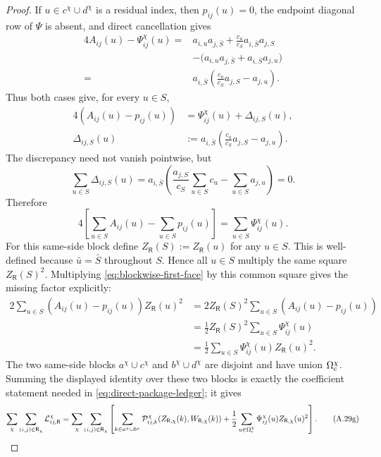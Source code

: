 \documentclass[11pt]{article}
\begin{document}
\begin{proof}
If $u\in c^\chi\cup d^\chi$ is a residual index, then
$p_{ij}(u)=0$, the endpoint diagonal row of $\Psi$ is absent, and direct
cancellation gives
\[
\begin{aligned}
4A_{ij}(u)-\Psi_{ij}^{\chi}(u)
={}&a_{i,u}a_{j,\bar S}
+\frac{c_u}{c_S}a_{i,\bar S}a_{j,S}\\
&-\bigl(a_{i,u}a_{j,\bar S}
       +a_{i,\bar S}a_{j,u}\bigr)\\
={}&a_{i,\bar S}\left(
\frac{c_u}{c_S}a_{j,S}-a_{j,u}\right).
\end{aligned}
\]
Thus both cases give, for every $u\in S$,
\[
\begin{aligned}
4(A_{ij}(u)-p_{ij}(u))
&=\Psi_{ij}^{\chi}(u)+\Delta_{ij,S}(u),\\
\Delta_{ij,S}(u)
&:=a_{i,\bar S}
 \left(\frac{c_u}{c_S}a_{j,S}-a_{j,u}\right).
\end{aligned}
\]
The discrepancy need not vanish pointwise, but
\[
 \sum_{u\in S}\Delta_{ij,S}(u)
 =a_{i,\bar S}\left(
 \frac{a_{j,S}}{c_S}\sum_{u\in S}c_u
 -\sum_{u\in S}a_{j,u}
 \right)=0.
\]
Therefore
\begin{equation}\label{eq:blockwise-first-face}
4\left[
 \sum_{u\in S}A_{ij}(u)-\sum_{u\in S}p_{ij}(u)
 \right]
=\sum_{u\in S}\Psi_{ij}^{\chi}(u).
\tag{A.30b}
\end{equation}
For this same-side block define $Z_{\mathsf R}(S):=Z_{\mathsf R}(u)$ for
any $u\in S$.  This is well-defined because $\bar u=\bar S$ throughout
$S$.  Hence all $u\in S$ multiply the same square
$Z_{\mathsf R}(S)^2$.  Multiplying \eqref{eq:blockwise-first-face} by this
common square gives the missing factor explicitly:
\[
\begin{aligned}
2\sum_{u\in S}(A_{ij}(u)-p_{ij}(u))Z_{\mathsf R}(u)^2
&=2Z_{\mathsf R}(S)^2
  \sum_{u\in S}(A_{ij}(u)-p_{ij}(u))\\
&=\frac12Z_{\mathsf R}(S)^2
  \sum_{u\in S}\Psi_{ij}^{\chi}(u)\\
&=\frac12\sum_{u\in S}
  \Psi_{ij}^{\chi}(u)Z_{\mathsf R}(u)^2.
\end{aligned}
\]
The two same-side blocks
$a^\chi\cup c^\chi$ and $b^\chi\cup d^\chi$ are disjoint and have union
$\Omega_{\rm c}^\chi$.  Summing the displayed identity over these two blocks
is exactly the coefficient statement needed in
\eqref{eq:direct-package-ledger}; it gives
\begin{equation}\label{eq:direct-row-class-ledger}
\sum_\chi\sum_{(i,j)\in\mathsf R_\chi}
\mathcal L_{ij,\mathsf R}^{\chi}
=\sum_\chi\sum_{(i,j)\in\mathsf R_\chi}\left[
 \sum_{k\in a^\chi\cup b^\chi}
 \mathcal P_{ij,k}^{\chi}
 (Z_{\mathsf R,\chi}(k),W_{\mathsf R,\chi}(k))
 +\frac12\sum_{u\in\Omega_{\rm c}^\chi}
 \Psi_{ij}^{\chi}(u)Z_{\mathsf R,\chi}(u)^2
\right].
\tag{A.29g}
\end{equation}


\end{proof}
\end{document}
